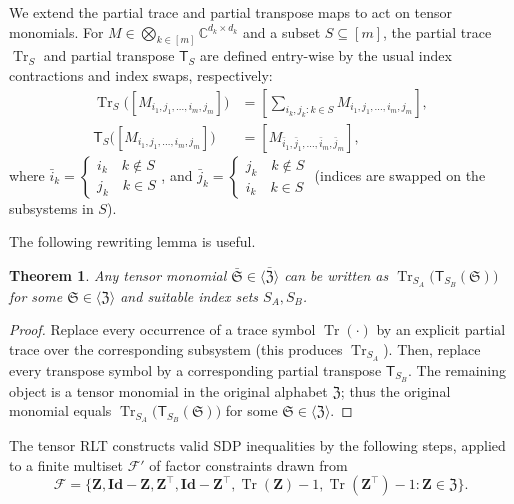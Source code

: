 \documentclass[smallextended]{svjour3}
\newtheorem{theorem}{Theorem}
\newcommand{\C}{\mathbb C}
\newcommand{\fS}{\mathfrak S}
\newcommand{\fZ}{\mathfrak Z}
\newcommand{\cF}{\mathcal F}
\newcommand{\Z}{\mathbf{Z}}
\newcommand{\1}{\mathbf{1}}
\newcommand{\Id}{\mathbf{Id}}
\DeclareMathOperator{\tr}{Tr}
\newcommand{\Tr}{\mathsf{T}}
\DeclareMathOperator{\bmtens}{\bigotimes}
\begin{document}
We extend the partial trace and partial transpose maps to act on tensor monomials. For $M\in\bmtens_{k\in[m]}\C^{d_k\times d_k}$ and a subset $S\subseteq[m]$, the partial trace $\tr_S$ and partial transpose $\Tr_S$ are defined entry-wise by the usual index contractions and index swaps, respectively:
\begin{align}
\label{eq.trace}
\tr_S\bigl([M_{i_1,j_1,\dots,i_m,j_m}]\bigr)
&= [\sum_{i_k,j_k:k\in S} M_{i_1,j_1,\dots,i_m,j_m}],\\
\label{eq.transpose}
\Tr_S\bigl([M_{i_1,j_1,\dots,i_m,j_m}]\bigr)
&= [M_{\bar i_1,\bar j_1,\dots,\bar i_m,\bar j_m}],
\end{align}
where $\bar{i}_k = \begin{cases}
    i_k\quad k \notin S\\
    j_k\quad k \in S
\end{cases}$, and $\bar{j}_k = \begin{cases}
    j_k\quad k \notin S\\
    i_k\quad k \in S
\end{cases}$ (indices are swapped on the subsystems in $S$).

The following rewriting lemma is useful.

\begin{theorem}
\label{thm.rewrite}
Any tensor monomial $\bar{\fS}\in\langle\bar{\fZ}\rangle$ can be written as $\tr_{S_A}\!\bigl(\Tr_{S_B}(\fS)\bigr)$ for some $\fS\in\langle\fZ\rangle$ and suitable index sets $S_A,S_B$.
\end{theorem}
\begin{proof}
Replace every occurrence of a trace symbol $\tr(\cdot)$ by an explicit partial trace over the corresponding subsystem (this produces $\tr_{S_A}$). Then, replace every transpose symbol by a corresponding partial transpose $\Tr_{S_B}$. The remaining object is a tensor monomial in the original alphabet $\fZ$; thus the original monomial equals $\tr_{S_A}\bigl(\Tr_{S_B}(\fS)\bigr)$ for some $\fS\in\langle\fZ\rangle$.
\end{proof}

The tensor RLT constructs valid SDP inequalities by the following steps, applied to a finite multiset $\cF'$ of factor constraints drawn from
\[
\cF=\{\Z,\Id-\Z,\Z^\top,\Id-\Z^\top,\tr(\Z)-1,\tr(\Z^\top)-1:\Z\in\fZ\}.
\]
\end{document}
